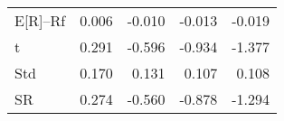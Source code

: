 \begin{tabular}{lrrrr}
\toprule
\midrule
E[R]--Rf & 0.006 & -0.010 & -0.013 & -0.019 \\
t & 0.291 & -0.596 & -0.934 & -1.377 \\
Std & 0.170 & 0.131 & 0.107 & 0.108 \\
SR & 0.274 & -0.560 & -0.878 & -1.294 \\
\bottomrule
\end{tabular}
